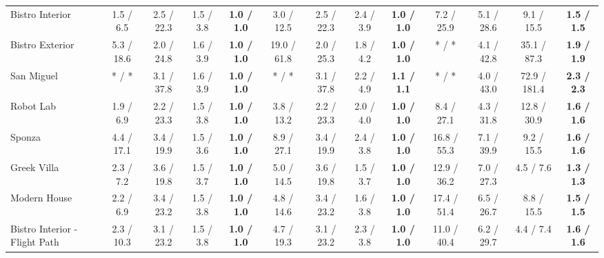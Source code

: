 \begin{table*}[t]
\begin{tabular}{l cccc|cccc|cccc}
		Bistro Interior               & 1.5 / 6.5            & 2.5 / 22.3           & 1.5 / 3.8            & \textbf{1.0 / 1.0}   & 3.0 / 12.5           & 2.5 / 22.3           & 2.4 / 3.9            & \textbf{1.0 / 1.0}   & 7.2 / 25.9           & 5.1 / 28.6           & 9.1 / 15.5           & \textbf{1.5 / 1.5}   \\
		Bistro Exterior               & 5.3 / 18.6           & 2.0 / 24.8           & 1.6 / 3.9            & \textbf{1.0 / 1.0}   & 19.0 / 61.8          & 2.0 / 25.3           & 1.8 / 4.2            & \textbf{1.0 / 1.0}   & * / *                & 4.1 / 42.8           & 35.1 / 87.3          & \textbf{1.9 / 1.9}   \\
		San Miguel                    & * / *                & 3.1 / 37.8           & 1.6 / 3.9            & \textbf{1.0 / 1.0}   & * / *                & 3.1 / 37.8           & 2.2 / 4.9            & \textbf{1.1 / 1.1}   & * / *                & 4.0 / 43.0           & 72.9 / 181.4         & \textbf{2.3 / 2.3}   \\
		Robot Lab                     & 1.9 / 6.9            & 2.2 / 23.3           & 1.5 / 3.8            & \textbf{1.0 / 1.0}   & 3.8 / 13.2           & 2.2 / 23.3           & 2.0 / 4.0            & \textbf{1.0 / 1.0}   & 8.4 / 27.1           & 4.3 / 31.8           & 12.8 / 30.9          & \textbf{1.6 / 1.6}   \\
		Sponza                        & 4.4 / 17.1           & 3.4 / 19.9           & 1.5 / 3.6            & \textbf{1.0 / 1.0}   & 8.9 / 27.1           & 3.4 / 19.9           & 2.4 / 3.8            & \textbf{1.0 / 1.0}   & 16.8 / 55.3          & 7.1 / 39.9           & 9.2 / 15.5           & \textbf{1.6 / 1.6}   \\
		Greek Villa                   & 2.3 / 7.2            & 3.6 / 19.8           & 1.5 / 3.7            & \textbf{1.0 / 1.0}   & 5.0 / 14.5           & 3.6 / 19.8           & 1.5 / 3.7            & \textbf{1.0 / 1.0}   & 12.9 / 36.2          & 7.0 / 27.3           & 4.5 / 7.6            & \textbf{1.3 / 1.3}   \\
		Modern House                  & 2.2 / 6.9            & 3.4 / 23.2           & 1.5 / 3.8            & \textbf{1.0 / 1.0}   & 4.8 / 14.6           & 3.4 / 23.2           & 1.6 / 3.8            & \textbf{1.0 / 1.0}   & 17.4 / 51.4          & 6.5 / 26.7           & 8.8 / 15.5           & \textbf{1.5 / 1.5}   \\
		Bistro Interior - Flight Path & 2.3 / 10.3           & 3.1 / 23.2           & 1.5 / 3.8            & \textbf{1.0 / 1.0}   & 4.7 / 19.3           & 3.1 / 23.2           & 2.3 / 3.8            & \textbf{1.0 / 1.0}   & 11.0 / 40.4          & 6.2 / 29.7           & 4.4 / 7.4            & \textbf{1.6 / 1.6}   \\

\end{tabular}
\end{table*}
